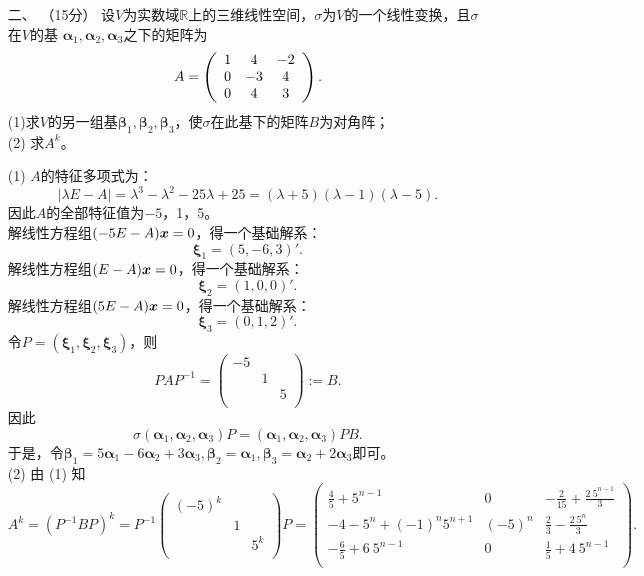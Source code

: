 \begin{enumerate}[1~]
\item[二、]（15分）
设$V$为实数域$\mathbb{R}$上的三维线性空间，$\sigma$为$V$的一个线性变换，且$\sigma$在$V$的基
$\boldsymbol{\alpha} _ { 1 } , \boldsymbol{\alpha} _ { 2 }, \boldsymbol{\alpha}_3$之下的矩阵为\[
A = \left( \begin{array} { c c c } { 1 } & { 4 } & { - 2 } \\ { 0 } & { - 3 } & { 4 } \\ { 0 } & { 4 } & { 3 } \end{array} \right).
\] 
(1)求$V$的另一组基$\boldsymbol{\beta} _ { 1 } ,  \boldsymbol{\beta} _ { 2 } ,  \boldsymbol{\beta} _ { 3 }$，使$\sigma$在此基下的矩阵$B$为对角阵；\\
(2) 求$A^k$。
\begin{solution}
(1) $A$的特征多项式为：\[
|\lambda E-A|=\lambda^3-\lambda^2-25 \lambda+25=(\lambda+5)(\lambda-1)(\lambda-5).
\]
因此$A$的全部特征值为$-5$，1，5。\\
解线性方程组$(-5E-A)\boldsymbol{x}=0$，得一个基础解系：\[
\boldsymbol{\xi}_1=(5, -6, 3)'.
\]
解线性方程组$(E-A)\boldsymbol{x}=0$，得一个基础解系：\[
\boldsymbol{\xi}_2=(1, 0, 0)'.
\]
解线性方程组$(5E-A)\boldsymbol{x}=0$，得一个基础解系：\[
\boldsymbol{\xi}_3=(0, 1, 2)'.
\]
令$P=(\boldsymbol{\xi}_1, \boldsymbol{\xi}_2, \boldsymbol{\xi}_3)$，则\[
PAP^{-1}=\left( \begin{matrix}
	-5&		&		\\
	&		1&		\\
	&		&		5\\
\end{matrix} \right):=B.
\]
因此\[
\sigma(\boldsymbol{\alpha}_1, \boldsymbol{\alpha}_2, \boldsymbol{\alpha}_3)P=(\boldsymbol{\alpha}_1, \boldsymbol{\alpha}_2, \boldsymbol{\alpha}_3)PB.
\]
于是，令$\boldsymbol{\beta}_1=5\boldsymbol{\alpha} _1-6\boldsymbol{\alpha} _2+3\boldsymbol{\alpha} _3, \boldsymbol{\beta} _2=\boldsymbol{\alpha} _1, \boldsymbol{\beta} _3=\boldsymbol{\alpha} _2+2\boldsymbol{\alpha} _3$即可。\\
(2) 由 (1) 知\[
A^k=(P^{-1}BP)^k=P^{-1}\left( \begin{matrix}
	(-5)^k&		&		\\
	&		1&		\\
	&		&		5^k\\
\end{matrix} \right)P=\left(
\begin{array}{ccc}
 \frac{4}{5}+5^{n-1} & 0 & -\frac{2}{15}+\frac{2\ 5^{n-1}}{3} \\
 -4-5^n+(-1)^n 5^{n+1} & (-5)^n & \frac{2}{3}-\frac{2\ 5^n}{3} \\
 -\frac{6}{5}+6\ 5^{n-1} & 0 & \frac{1}{5}+4\ 5^{n-1} \\
\end{array}
\right).
\]
\end{solution}


\end{enumerate}
